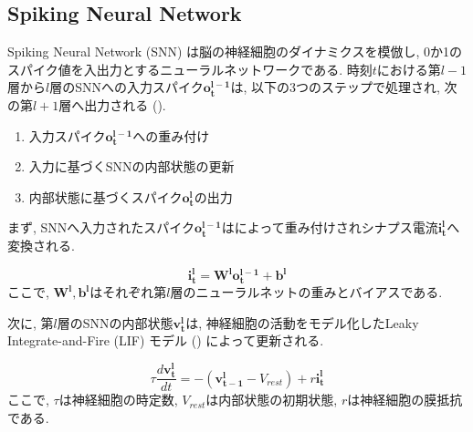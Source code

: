 \makeatletter %
\subsection{Spiking Neural Network}
Spiking Neural Network (SNN) は脳の神経細胞のダイナミクスを模倣し, 0か1のスパイク値を入出力とするニューラルネットワークである.
時刻$t$における第$l-1$層から$l$層のSNNへの入力スパイク$\bm{o_t^{l-1}}$は, 以下の3つのステップで処理され, 次の第$l+1$層へ出力される ().

\begin{enumerate}
    \item 入力スパイク$\bm{o_t^{l-1}}$への重み付け
    \item 入力に基づくSNNの内部状態の更新
    \item 内部状態に基づくスパイク$\bm{o_t^l}$の出力
\end{enumerate}


まず, SNNへ入力されたスパイク$\bm{o_t^{l-1}}$はによって重み付けされシナプス電流$\bm{i_t^l}$へ変換される.

\begin{equation}
    \bm{i_t^l} = \bm{W^l}\bm{o_t^{l-1}} + \bm{b^l}
    \label{eq:input_spike}
\end{equation}
ここで, $\bm{W^l}, \bm{b^l}$はそれぞれ第$l$層のニューラルネットの重みとバイアスである.

次に, 第$l$層のSNNの内部状態$\bm{v_t^l}$は, 神経細胞の活動をモデル化したLeaky Integrate-and-Fire (LIF) モデル () によって更新される.

\begin{equation}
    {\tau}\frac{d\bm{v_t^l}}{dt}=-(\bm{v_{t-1}^l}-V_{rest})+r\bm{i_t^l}
    \label{eq:lif}
\end{equation}
ここで, $\tau$は神経細胞の時定数, $V_{rest}$は内部状態の初期状態, $r$は神経細胞の膜抵抗である.

